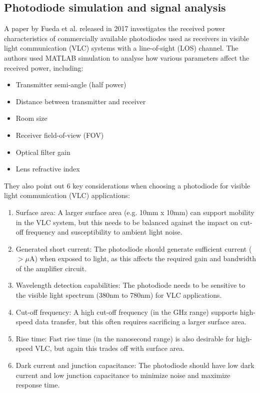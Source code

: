 \subsection{Photodiode simulation and signal analysis}
A paper by Fueda et al. released in 2017 investigates the received power characteristics of commercially available photodiodes used as receivers in visible light communication (VLC) systems with a line-of-sight (LOS) channel. The authors used MATLAB simulation to analyse how various parameters affect the received power, including:

\begin{itemize}
    \item Transmitter semi-angle (half power)
    \item Distance between transmitter and receiver
    \item Room size
    \item Receiver field-of-view (FOV)
    \item Optical filter gain
    \item Lens refractive index
\end{itemize}

They also point out 6 key considerations when choosing a photodiode for visible light communication (VLC) applications:

\begin{enumerate}
    \item Surface area: A larger surface area (e.g. 10mm x 10mm) can support mobility in the VLC system, but this needs to be balanced against the impact on cut-off frequency and susceptibility to ambient light noise.
    
    \item Generated short current: The photodiode should generate sufficient current ($>\mu$A) when exposed to light, as this affects the required gain and bandwidth of the amplifier circuit.
    
    \item Wavelength detection capabilities: The photodiode needs to be sensitive to the visible light spectrum (380nm to 780nm) for VLC applications.
    
    \item Cut-off frequency: A high cut-off frequency (in the GHz range) supports high-speed data transfer, but this often requires sacrificing a larger surface area.
    
    \item Rise time: Fast rise time (in the nanosecond range) is also desirable for high-speed VLC, but again this trades off with surface area.
    
    \item Dark current and junction capacitance: The photodiode should have low dark current and low junction capacitance to minimize noise and maximize response time.
\end{enumerate}

